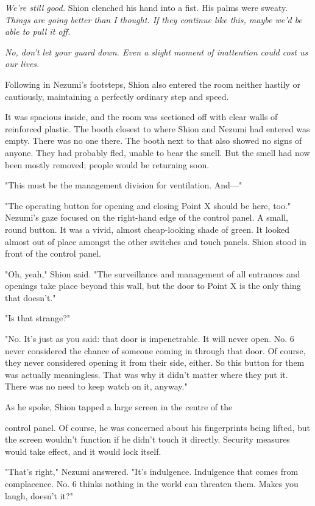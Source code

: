\emph{We're still good.} Shion clenched his hand into a fist. His palms were
sweaty. \emph{Things are going better than I thought. If they continue like
this, maybe we'd be able to pull it off.}

\emph{No, don't let your guard down. Even a slight moment of inattention could
cost us our lives.}

Following in Nezumi's footsteps, Shion also entered the room neither
hastily or cautiously, maintaining a perfectly ordinary step and speed.

It was spacious inside, and the room was sectioned off with clear walls
of reinforced plastic. The booth closest to where Shion and Nezumi had
entered was empty. There was no one there. The booth next to that also
showed no signs of anyone. They had probably fled, unable to bear the
smell. But the smell had now been mostly removed; people would be
returning soon.

"This must be the management division for ventilation. And---"

"The operating button for opening and closing Point X should be here,
too." Nezumi's gaze focused on the right-hand edge of the control panel.
A small, round button. It was a vivid, almost cheap-looking shade of
green. It looked almost out of place amongst the other switches and
touch panels. Shion stood in front of the control panel.

"Oh, yeah," Shion said. "The surveillance and management of all
entrances and openings take place beyond this wall, but the door to
Point X is the only thing that doesn't."

"Is that strange?"

"No. It's just as you said: that door is impenetrable. It will never
open. No. 6 never considered the chance of someone coming in through
that door. Of course, they never considered opening it from their side,
either. So this button for them was actually meaningless. That was why
it didn't matter where they put it. There was no need to keep watch on
it, anyway."

As he spoke, Shion tapped a large screen in the centre of the~

control panel. Of course, he was concerned about his fingerprints being
lifted, but the screen wouldn't function if he didn't touch it directly.
Security measures would take effect, and it would lock itself.

"That's right," Nezumi answered. "It's indulgence. Indulgence that comes
from complacence. No. 6 thinks nothing in the world can threaten them.
Makes you laugh, doesn't it?"

